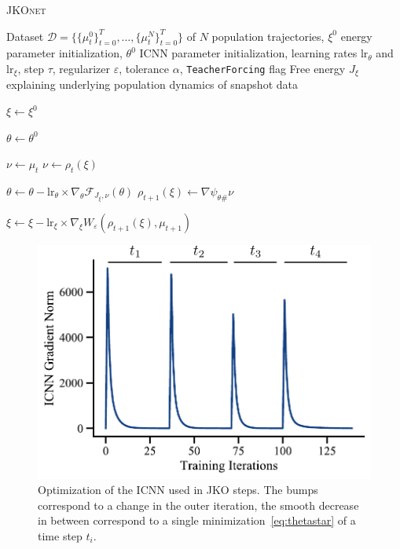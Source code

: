 \begin{algorithm}[t]
\caption{\textsc{JKOnet}}
\label{algo:jkonet}
\begin{algorithmic}


    Dataset $\mathcal{D}=\{\{\mu_t^0 \}_{t=0}^T, \ldots, \{\mu_t^N \}_{t=0}^T\}$ of $N$ population trajectories, $\xi^0$ energy parameter initialization, $\theta^0$ ICNN parameter initialization, learning rates $\text{lr}_\theta$ and $\text{lr}_\xi$, step $\tau$, regularizer $\varepsilon$, tolerance $\alpha$, {\texttt{TeacherForcing}} flag
    Free energy $J_{\xi}$ explaining underlying population dynamics of snapshot data
   \smallskip
   
   \STATE $\xi\leftarrow \xi^0$

   \STATE $\theta\leftarrow \theta^0$

    \STATE $\nu \leftarrow \mu_t$
   \ELSE
   \STATE $\nu \leftarrow \rho_t(\xi)$
   \ENDIF
    
   \STATE $\theta \leftarrow \theta - \text{lr}_\theta \times \nabla_\theta \mathcal{F}_{J_\xi,\nu}(\theta)$
   \ENDWHILE
   \STATE $\rho_{t+1}(\xi) \leftarrow \nabla \psi_{\theta \#} \nu$

   \STATE $\xi \leftarrow \xi - \text{lr}_\xi \times \nabla_\xi W_\varepsilon(\rho_{t+1}(\xi), \mu_{t+1})$
   \ENDFOR
   \ENDFOR
	
\end{algorithmic}
\end{algorithm}

\begin{figure}
    \centering
    \includegraphics[width=\textwidth]{figures/fig_optimization_icnn.pdf}
    \caption{Optimization of the ICNN used in \acrshort{JKO} steps. The bumps correspond to a change in the outer iteration, the smooth decrease in between correspond to a single minimization~\eqref{eq:thetastar} of a time step $t_i$. }
    \label{fig:training_icnn}
\end{figure}

